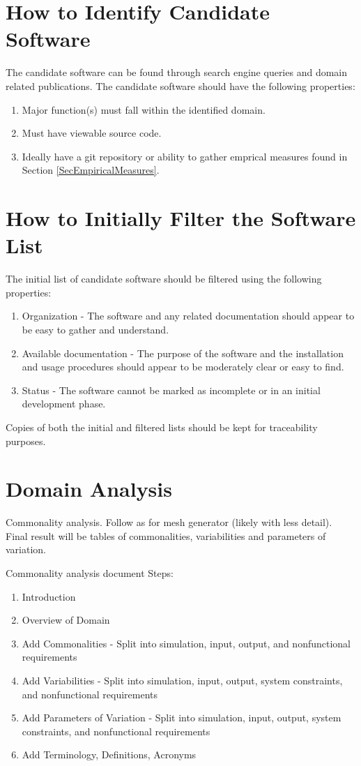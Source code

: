 \documentclass[letterpaper,cleveref]{lipics-v2019}
\theoremstyle{definition}
\begin{document}
\section{How to Identify Candidate Software} \label{SecIdentifyCandSoft}
The candidate software can be found through search engine queries and domain related publications. The candidate software should have the following properties:
\begin{enumerate}
	\item Major function(s) must fall within the identified domain.
	\item Must have viewable source code.
	\item Ideally have a git repository or ability to gather emprical measures found in Section \ref{SecEmpiricalMeasures}.
\end{enumerate}

\section{How to Initially Filter the Software List} \label{SecInitialFilter}
The initial list of candidate software should be filtered using the following properties:
\begin{enumerate}
	\item Organization - The software and any related documentation should appear to be easy to gather and understand.
	\item Available documentation - The purpose of the software and the installation and usage procedures should appear to be moderately clear or easy to find.
	\item Status - The software cannot be marked as incomplete or in an initial development phase.
\end{enumerate}


Copies of both the initial and filtered lists should be kept for traceability purposes.

\section{Domain Analysis} \label{SecDomainAnalysis}

Commonality analysis.  Follow as for mesh generator (likely with less detail).
Final result will be tables of commonalities, variabilities and parameters of
variation.

Commonality analysis document Steps:
\begin{enumerate}
\item Introduction
\item Overview of Domain
\item Add Commonalities - Split into simulation, input, output, and
  nonfunctional requirements
\item Add Variabilities - Split into simulation, input, output, system
  constraints, and nonfunctional requirements
\item Add Parameters of Variation - Split into simulation, input, output, system
  constraints, and nonfunctional requirements
\item Add Terminology, Definitions, Acronyms
\end{enumerate}
\end{document}
